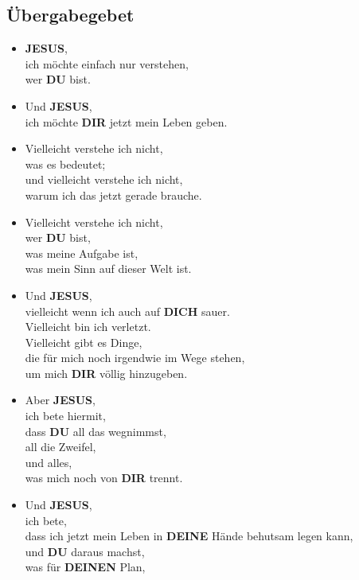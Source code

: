 \documentclass[10pt,a5paper]{article}
\newcommand{\Deinen}[0]{\textbf{DEINEN}}
\newcommand{\Deine}[0]{\textbf{DEINE}}
\newcommand{\Dich}[0]{\textbf{DICH}}
\newcommand{\Dir}[0]{\textbf{DIR}}
\newcommand{\Du}[0]{\textbf{DU}}
\newcommand{\Jesus}[0]{\textbf{JESUS}}
\begin{document}
	\subsection{\"Ubergabegebet}
		\begin{itemize}[nosep]
			\item	{\Jesus},
					\\
					ich m\"ochte einfach nur verstehen,
					\\
					wer {\Du} bist.
			\item	Und {\Jesus},
					\\
					ich m\"ochte {\Dir} jetzt mein Leben geben.
			\item	Vielleicht verstehe ich nicht,
					\\
					was es bedeutet;
					\\
					und vielleicht verstehe ich nicht,
					\\
					warum ich das jetzt gerade brauche.
			\item	Vielleicht verstehe ich nicht,
					\\
					wer {\Du} bist,
					\\
					was meine Aufgabe ist,
					\\
					was mein Sinn auf dieser Welt ist.
			\item	Und {\Jesus},
					\\
					vielleicht wenn ich auch auf {\Dich} sauer.
					\\
					Vielleicht bin ich verletzt.
					\\
					Vielleicht gibt es Dinge,
					\\
					die für mich noch irgendwie im Wege stehen,
					\\
					um mich {\Dir} v\"ollig hinzugeben.
			\item	Aber {\Jesus},
					\\
					ich bete hiermit,
					\\
					dass {\Du} all das wegnimmst,
					\\
					all die Zweifel,
					\\
					und alles,
					\\
					was mich noch von {\Dir} trennt.
			\item	Und {\Jesus},
					\\
					ich bete,
					\\
					dass ich jetzt mein Leben in {\Deine} H\"ande behutsam legen kann,
					\\
					und {\Du} daraus machst,
					\\
					was f\"ur {\Deinen} Plan,

\end{itemize}
\end{document}

